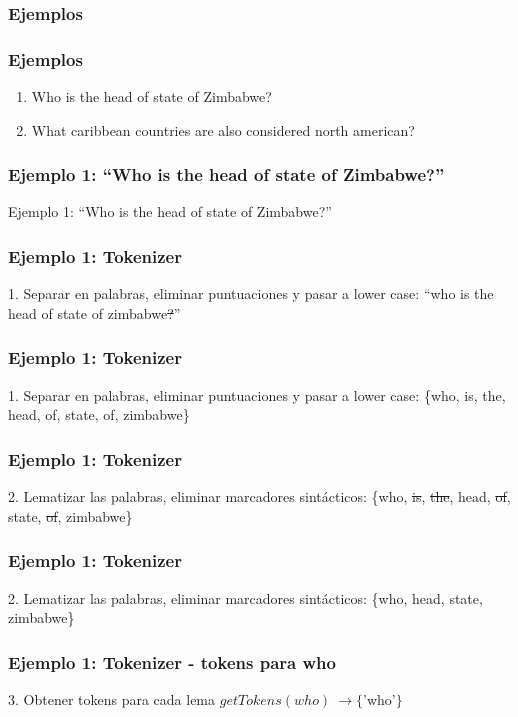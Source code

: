 \subsubsection*{Ejemplos}
\begin{frame}
\frametitle{Ejemplos}
  \begin{enumerate}
    \item Who is the head of state of Zimbabwe?
    \bigskip
    \item What caribbean countries are also considered north american?
  \end{enumerate}
\end{frame}

\begin{frame}[t]
\frametitle{Ejemplo 1: ``Who is the head of state of Zimbabwe?''}
Ejemplo 1:\newline
  \Large{``Who is the head of state of Zimbabwe?''}
\end{frame}

\begin{frame}[t]
\frametitle{Ejemplo 1: Tokenizer}
1. Separar en palabras, eliminar puntuaciones y pasar a lower case:\newline
  \Large{``{\color{blue}w}ho is the head of state of {\color{blue}z}imbabwe{\color{red}\st{?}}''}
\end{frame}


\begin{frame}[t]
\frametitle{Ejemplo 1: Tokenizer}
1. Separar en palabras, eliminar puntuaciones y pasar a lower case:\newline
  \Large{\{{\color{blue}w}ho, is, the, head, of, state, of, {\color{blue}z}imbabwe\}}
\end{frame}
\begin{frame}[t]
\frametitle{Ejemplo 1: Tokenizer}
2. Lematizar las palabras, eliminar marcadores sintácticos:\newline
  \Large{\{who, {\color{red}\st{is}}, {\color{red}\st{the}}, head, {\color{red}\st{of}}, state, {\color{red}\st{of}}, zimbabwe\}}
\end{frame}

\begin{frame}[t]
\frametitle{Ejemplo 1: Tokenizer}
2. Lematizar las palabras, eliminar marcadores sintácticos:\newline
  \Large{\{who, head, state, zimbabwe\}}
\end{frame}

\begin{frame}[t]
\frametitle{Ejemplo 1: Tokenizer - tokens para who}
3. Obtener tokens para cada lema \newline
    \Large{$getTokens(who)\ \rightarrow \{$'who'$\}$}
\end{frame}

